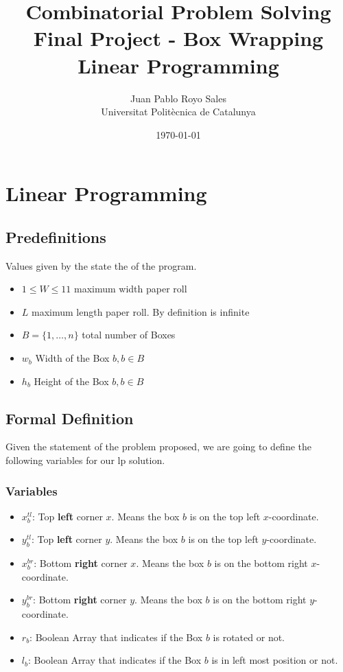 \documentclass[12pt, a4paper]{article}
\title{%
      Combinatorial Problem Solving \\
      Final Project - Box Wrapping \\
      Linear Programming
}
\author{%
  Juan Pablo Royo Sales \\
  \small{Universitat Politècnica de Catalunya}
}
\date\today
\begin{document}
\maketitle

\section{Linear Programming}

\subsection{Predefinitions}
Values given by the state the of the program.

\begin{itemize}
  \item $1 \leq W \leq 11$ maximum width paper roll
  \item $L$ maximum length paper roll. By definition is infinite
  \item $B = \{1, \dots, n\}$ total number of Boxes
  \item $w_b$ Width of the Box $b, b \in B$
  \item $h_b$ Height of the Box $b, b \in B$
\end{itemize}

\subsection{Formal Definition}
Given the statement of the problem proposed, we are going to define the following variables for our \acrfull{lp} solution.

\subsubsection{Variables}
\begin{itemize}
  \item $x_b^{tl}$: Top \textbf{left} corner $x$. Means the box $b$ is on the top left $x$-coordinate.
  \item $y_b^{tl}$: Top \textbf{left} corner $y$. Means the box $b$ is on the top left $y$-coordinate.
  \item $x_b^{br}$: Bottom \textbf{right} corner $x$. Means the box $b$ is on the bottom right $x$-coordinate.
  \item $y_b^{br}$: Bottom \textbf{right} corner $y$. Means the box $b$ is on the bottom right $y$-coordinate.
  \item $r_b$: Boolean Array that indicates if the Box $b$ is rotated or not.

  \item $l_b$: Boolean Array that indicates if the Box $b$ is in left most position or not.
\end{itemize}
\end{document}

